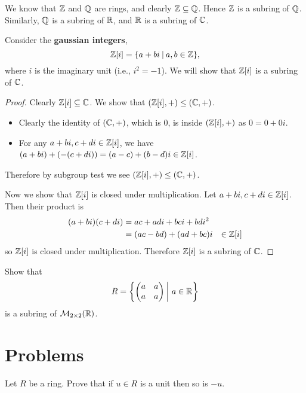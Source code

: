 \begin{example}
    We know that $\mathbb{Z}$ and $\mathbb{Q}$ are rings, and clearly $\mathbb{Z} \subseteq \mathbb{Q}$. Hence $\mathbb{Z}$ is a subring of $\mathbb{Q}$. Similarly, $\mathbb{Q}$ is a subring of $\mathbb{R}$, and $\mathbb{R}$ is a subring of $\mathbb{C}$.
\end{example}

\begin{example}
    Consider the \textbf{gaussian integers},
    \[
        \Z[i] = \{a + bi \vert a,b\in\mathbb{Z}\},
    \]
    where $i$ is the imaginary unit (i.e., $i^2 = -1$). We will show that $\mathbb{Z}[i]$ is a subring of $\mathbb{C}$.
    \begin{proof}
        Clearly $\mathbb{Z}[i] \subseteq \mathbb{C}$. We show that $(\mathbb{Z}[i], +) \leq (\mathbb{C}, +)$.
        \begin{itemize}
            \item Clearly the identity of $(\mathbb{C}, +)$, which is 0, is inside $(\mathbb{Z}[i], +)$ as $0 = 0 + 0i$.
            \item For any $a + bi, c+di \in \mathbb{Z}[i]$, we have $(a+bi) + (-(c+di)) = (a-c) + (b-d)i \in \mathbb{Z}[i]$.
        \end{itemize}
        Therefore by subgroup test we see $(\mathbb{Z}[i], +) \leq (\mathbb{C}, +)$.

        Now we show that $\mathbb{Z}[i]$ is closed under multiplication. Let $a + bi, c+di \in \mathbb{Z}[i]$. Then their product is
        \begin{align*}
            (a+bi)(c+di) &= ac+adi+bci+bdi^2\\
            &= (ac-bd) + (ad+bc)i
            &\in \mathbb{Z}[i]
        \end{align*}
        so $\mathbb{Z}[i]$ is closed under multiplication. Therefore $\mathbb{Z}[i]$ is a subring of $\mathbb{C}$.
    \end{proof}
\end{example}
\begin{exercise}
    Show that
    \[
        R = \left\{\begin{pmatrix}a&a\\a&a\end{pmatrix} \vert a \in \R\right\}
    \]
    is a subring of $\mathcal{M}_{2\times2}(\mathbb{R})$.
\end{exercise}

\newpage

\section{Problems}
\begin{problem}
    Let $R$ be a ring. Prove that if $u \in R$ is a unit then so is $-u$.
\end{problem}

